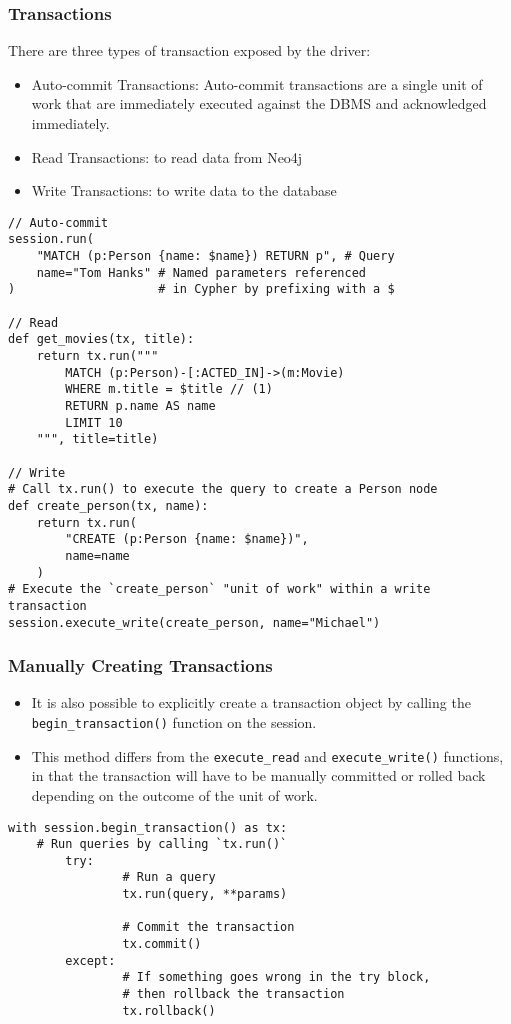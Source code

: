 \begin{frame}[fragile]\frametitle{Transactions}
There are three types of transaction exposed by the driver:


\begin{itemize}
\item Auto-commit Transactions: Auto-commit transactions are a single unit of work that are immediately executed against the DBMS and acknowledged immediately. 
\item Read Transactions: to read data from Neo4j
\item Write Transactions: to write data to the database
\end{itemize}

\begin{lstlisting}
// Auto-commit
session.run(
    "MATCH (p:Person {name: $name}) RETURN p", # Query
    name="Tom Hanks" # Named parameters referenced
)                    # in Cypher by prefixing with a $

// Read
def get_movies(tx, title):
    return tx.run("""
        MATCH (p:Person)-[:ACTED_IN]->(m:Movie)
        WHERE m.title = $title // (1)
        RETURN p.name AS name
        LIMIT 10
    """, title=title)

// Write
# Call tx.run() to execute the query to create a Person node
def create_person(tx, name):
    return tx.run(
        "CREATE (p:Person {name: $name})",
        name=name
    )
# Execute the `create_person` "unit of work" within a write transaction
session.execute_write(create_person, name="Michael")		
\end{lstlisting}

\end{frame}

\begin{frame}[fragile]\frametitle{Manually Creating Transactions}

\begin{itemize}
\item It is also possible to explicitly create a transaction object by calling the \lstinline|begin_transaction()| function on the session.
\item This method differs from the \lstinline|execute_read| and \lstinline|execute_write()| functions, in that the transaction will have to be manually committed or rolled back depending on the outcome of the unit of work.
\end{itemize}

\begin{lstlisting}
with session.begin_transaction() as tx:
    # Run queries by calling `tx.run()`	
		try:
				# Run a query
				tx.run(query, **params)

				# Commit the transaction
				tx.commit()
		except:
				# If something goes wrong in the try block,
				# then rollback the transaction
				tx.rollback()
\end{lstlisting}
				
\end{frame}

